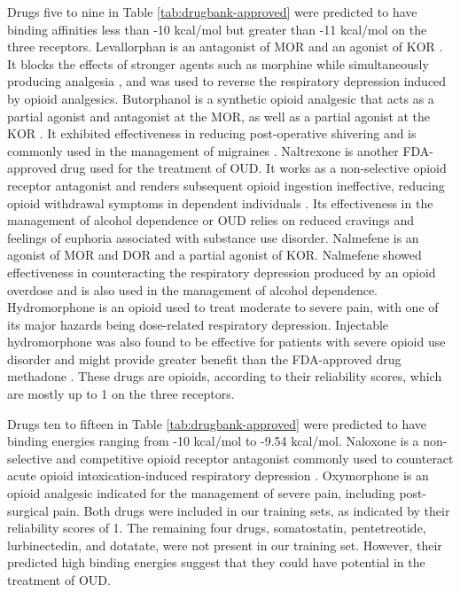 \documentclass[10pt]{article}
\begin{document}
		Drugs five to nine in Table \ref{tab:drugbank-approved} were predicted to have binding affinities less than -10 kcal/mol but greater than -11 kcal/mol on the three receptors. Levallorphan is an antagonist of MOR and an agonist of KOR \cite{goodman1955pharmacological}. It blocks the effects of stronger agents such as morphine while simultaneously producing analgesia \cite{codd1995serotonin}, and was used to reverse the respiratory depression induced by opioid analgesics. Butorphanol is a synthetic opioid analgesic that acts as a partial agonist and antagonist at the MOR, as well as a partial agonist at the KOR \cite{gharagozlou2006pharmacological}. It exhibited effectiveness in reducing post-operative shivering and is commonly used in the management of migraines \cite{gear1999kappa}. Naltrexone is another FDA-approved drug used for the treatment of OUD. It works as a non-selective opioid receptor antagonist and renders subsequent opioid ingestion ineffective, reducing opioid withdrawal symptoms in dependent individuals \cite{wang2019historical}. Its effectiveness in the management of alcohol dependence or OUD relies on reduced cravings and feelings of euphoria associated with substance use disorder. Nalmefene is an agonist of MOR and DOR and a partial agonist of KOR. Nalmefene showed effectiveness in counteracting the respiratory depression produced by an opioid overdose \cite{park2019prevention} and is also used in the management of alcohol dependence. Hydromorphone is an opioid used to treat moderate to severe pain, with one of its major hazards being dose-related respiratory depression. Injectable hydromorphone was also found to be effective for patients with severe opioid use disorder and might provide greater benefit than the FDA-approved drug methadone \cite{bansback2018cost}. These drugs are opioids, according to their reliability scores, which are mostly up to 1 on the three receptors.
		
		Drugs ten to fifteen in Table \ref{tab:drugbank-approved} were predicted to have binding energies ranging from -10 kcal/mol to -9.54 kcal/mol. Naloxone is a non-selective and competitive opioid receptor antagonist commonly used to counteract acute opioid intoxication-induced respiratory depression \cite{park2019prevention}. Oxymorphone is an opioid analgesic indicated for the management of severe pain, including post-surgical pain. Both drugs were included in our training sets, as indicated by their reliability scores of 1. The remaining four drugs, somatostatin, pentetreotide, lurbinectedin, and dotatate, were not present in our training set. However, their predicted high binding energies suggest that they could have potential in the treatment of OUD.
		
\end{document}
